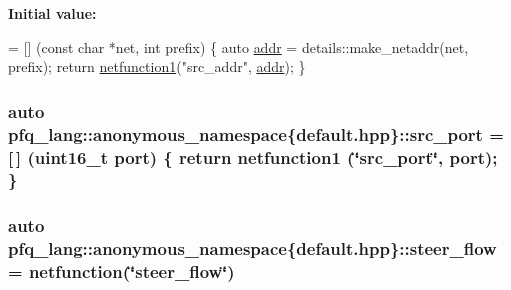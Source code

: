 {\bfseries Initial value\+:}
\begin{DoxyCode}
= [] (\textcolor{keyword}{const} \textcolor{keywordtype}{char} *net, \textcolor{keywordtype}{int} prefix)
        \{
            \textcolor{keyword}{auto} \hyperlink{namespacepfq__lang_1_1anonymous__namespace_02default_8hpp_03_aafce8334d1be83bff9a2115439c8c453}{addr} = details::make\_netaddr(net, prefix);
            \textcolor{keywordflow}{return} \hyperlink{namespacepfq__lang_af215f25fa7ebd61fdc90cf0ef78a3164}{netfunction1}(\textcolor{stringliteral}{"src\_addr"}, \hyperlink{namespacepfq__lang_1_1anonymous__namespace_02default_8hpp_03_aafce8334d1be83bff9a2115439c8c453}{addr});
        \}
\end{DoxyCode}
\hypertarget{namespacepfq__lang_1_1anonymous__namespace_02default_8hpp_03_ad4d03d1e69ba9608a2d87ac91a2b521f}{
\subsubsection[{src\+\_\+port}]{\setlength{\rightskip}{0pt plus 5cm}auto pfq\+\_\+lang\+::anonymous\+\_\+namespace\{default.\+hpp\}\+::src\+\_\+port = \mbox{[}$\,$\mbox{]} (uint16\+\_\+t {\bf port}) \{ return {\bf netfunction1} (\char`\"{}src\+\_\+port\char`\"{}, port); \}}}\label{namespacepfq__lang_1_1anonymous__namespace_02default_8hpp_03_ad4d03d1e69ba9608a2d87ac91a2b521f}
\hypertarget{namespacepfq__lang_1_1anonymous__namespace_02default_8hpp_03_aee7b4eb8c316f9c0cd6ee7bc22b517ef}{
\subsubsection[{steer\+\_\+flow}]{\setlength{\rightskip}{0pt plus 5cm}auto pfq\+\_\+lang\+::anonymous\+\_\+namespace\{default.\+hpp\}\+::steer\+\_\+flow = {\bf netfunction}(\char`\"{}steer\+\_\+flow\char`\"{})}}\label{namespacepfq__lang_1_1anonymous__namespace_02default_8hpp_03_aee7b4eb8c316f9c0cd6ee7bc22b517ef}
